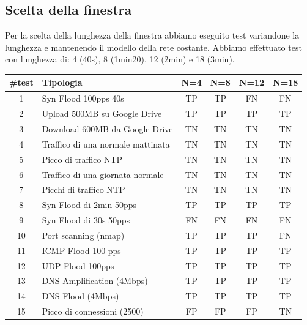\subsection{Scelta della finestra}

Per la scelta della lunghezza della finestra abbiamo eseguito test variandone la lunghezza e mantenendo il modello della rete costante.
Abbiamo effettuato test con lunghezza di: 4 (40s), 8 (1min20), 12 (2min) e 18 (3min).

\FloatBarrier
\begin{table}
    \begin{tabularx}{\textwidth}{||c X c c c c||}
        \hline
        \#test & Tipologia & N=4 & N=8 & N=12 & N=18\\ [0.5ex] 
        \hline\hline
        1 & Syn Flood 100pps 40s & TP & TP & \cellcolor{magenta} FN & \cellcolor{magenta} FN\\ 
        \hline
        2 & Upload 500MB su Google Drive & TP & TP & TP & TP\\ 
        \hline
        3 &  Download 600MB da Google Drive & TN  & TN & TN & TN\\ 
        \hline 
        4 & Traffico di una normale mattinata & TN & TN & TN & TN\\
        \hline
        5 & Picco di traffico NTP & TN & TN & TN & TN\\
        \hline
        6 & Traffico di una giornata normale & TN & TN & TN & TN\\ 
        \hline
        7 & Picchi di traffico NTP & TN & TN & TN & TN\\ 
        \hline 
        8 & Syn Flood di 2min 50pps & TP & TP & TP & TP\\
        \hline
        9 & Syn Flood di 30s 50pps & \cellcolor{magenta} FN & \cellcolor{magenta} FN & \cellcolor{magenta} FN & \cellcolor{magenta} FN\\        
        \hline
        10 & Port scanning (nmap) & TP & TP & TP & \cellcolor{magenta} FN\\
        \hline
        11 & ICMP Flood 100 pps & TP & TP & TP & TP\\
        \hline
        12 & UDP Flood 100pps & TP & TP & TP & TP\\ 
        \hline
        13 & DNS Amplification (4Mbps) & TP & TP & TP & TP\\ 
        \hline 
        14 & DNS Flood (4Mbps) & TP & TP & TP & TP\\
        \hline
        15 & Picco di connessioni (2500) & \cellcolor{orange} FP & \cellcolor{orange} FP & \cellcolor{orange} FP & TN \\        

\end{tabularx}
\end{table}
